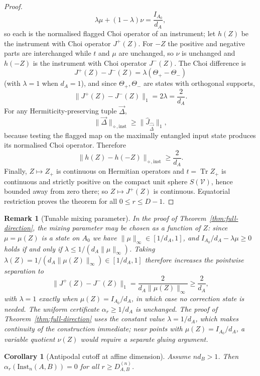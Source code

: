 \documentclass[11pt,a4paper]{article}
\newtheorem{corollary}[theorem]{Corollary}
\newtheorem{remark}[theorem]{Remark}
\newcommand{\Inst}{\mathrm{Inst}}
\newcommand{\Tr}{\operatorname{Tr}}
\newcommand{\Jhat}{\widehat J}
\newcommand{\vD}{\vec{\Delta}}
\begin{document}
\begin{proof}
\[
\lambda\mu+(1-\lambda)\nu=\frac{I_{A_0}}{d_A},
\]
so each is the normalised flagged Choi operator of an instrument; let $h(Z)$ be the instrument with Choi operator $J^+(Z)$. For $-Z$ the positive and negative parts are interchanged while $t$ and $\mu$ are unchanged, so $\nu$ is unchanged and $h(-Z)$ is the instrument with Choi operator $J^-(Z)$. The Choi difference is
\[
J^+(Z)-J^-(Z)=\lambda(\Theta_+-\Theta_-)
\]
(with $\lambda=1$ when $d_A=1$), and since $\Theta_+,\Theta_-$ are states with orthogonal supports,
\[
\|J^+(Z)-J^-(Z)\|_1=2\lambda=\frac2{d_A}.
\]
For any Hermiticity-preserving tuple $\vD$,
\[
\|\vD\|_{\diamond,\mathrm{inst}}\ge\|\Jhat_{\widehat{\vD}}\|_1,
\]
because testing the flagged map on the maximally entangled input state produces its normalised Choi operator. Therefore
\[
\|h(Z)-h(-Z)\|_{\diamond,\mathrm{inst}}\ge\frac2{d_A}.
\]
Finally, $Z\mapsto Z_+$ is continuous on Hermitian operators and $t=\Tr Z_+$ is continuous and strictly positive on the compact unit sphere $S(\mathcal V)$, hence bounded away from zero there; so $Z\mapsto J^+(Z)$ is continuous. Equatorial restriction proves the theorem for all $0\le r\le D-1$.
\end{proof}

\begin{remark}[Tunable mixing parameter]
\label{rem:tunable-lambda}
In the proof of Theorem~\ref{thm:full-direction}, the mixing parameter may be chosen as a function of $Z$: since $\mu=\mu(Z)$ is a state on $A_0$ we have $\|\mu\|_\infty\in[1/d_A,1]$, and $I_{A_0}/d_A-\lambda\mu\ge0$ holds if and only if $\lambda\le1/(d_A\|\mu\|_\infty)$. Taking $\lambda(Z)=1/(d_A\|\mu(Z)\|_\infty)\in[1/d_A,1]$ therefore increases the pointwise separation to
\[
\|J^+(Z)-J^-(Z)\|_1=\frac{2}{d_A\|\mu(Z)\|_\infty}\ge\frac2{d_A},
\]
with $\lambda=1$ exactly when $\mu(Z)=I_{A_0}/d_A$, in which case no correction state is needed. The uniform certificate $\alpha_r\ge1/d_A$ is unchanged. The proof of Theorem~\ref{thm:full-direction} uses the constant value $\lambda=1/d_A$, which makes continuity of the construction immediate; near points with $\mu(Z)=I_{A_0}/d_A$, a variable quotient $\nu(Z)$ would require a separate gluing argument.
\end{remark}

\begin{corollary}[Antipodal cutoff at affine dimension]
\label{cor:cutoff}
Assume $nd_B>1$. Then $\alpha_r(\Inst_n(A,B))=0$ for all $r\ge D_{A,B}^{(n)}$.
\end{corollary}
\end{document}
